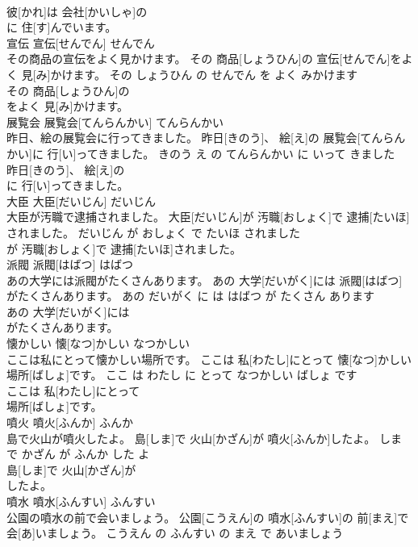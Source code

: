 \documentclass[8pt]{extreport}
\begin{document}
\begin{CJK}{UTF8}{min}
\\	彼[かれ]は 会社[かいしゃ]の
\\	に 住[す]んでいます。			
\\	宣伝	宣伝[せんでん]	せんでん	
\\	その商品の宣伝をよく見かけます。	その 商品[しょうひん]の 宣伝[せんでん]をよく 見[み]かけます。	その しょうひん の せんでん を よく みかけます	
\\	その 商品[しょうひん]の
\\	をよく 見[み]かけます。			
\\	展覧会	展覧会[てんらんかい]	てんらんかい	
\\	昨日、絵の展覧会に行ってきました。	昨日[きのう]、 絵[え]の 展覧会[てんらんかい]に 行[い]ってきました。	きのう え の てんらんかい に いって きました	
\\	昨日[きのう]、 絵[え]の
\\	に 行[い]ってきました。			
\\	大臣	大臣[だいじん]	だいじん	
\\	大臣が汚職で逮捕されました。	大臣[だいじん]が 汚職[おしょく]で 逮捕[たいほ]されました。	だいじん が おしょく で たいほ されました	
\\	が 汚職[おしょく]で 逮捕[たいほ]されました。			
\\	派閥	派閥[はばつ]	はばつ	
\\	あの大学には派閥がたくさんあります。	あの 大学[だいがく]には 派閥[はばつ]がたくさんあります。	あの だいがく に は はばつ が たくさん あります	
\\	あの 大学[だいがく]には
\\	がたくさんあります。			
\\	懐かしい	懐[なつ]かしい	なつかしい	
\\	ここは私にとって懐かしい場所です。	ここは 私[わたし]にとって 懐[なつ]かしい 場所[ばしょ]です。	ここ は わたし に とって なつかしい ばしょ です	
\\	ここは 私[わたし]にとって
\\	場所[ばしょ]です。			
\\	噴火	噴火[ふんか]	ふんか	
\\	島で火山が噴火したよ。	島[しま]で 火山[かざん]が 噴火[ふんか]したよ。	しま で かざん が ふんか した よ	
\\	島[しま]で 火山[かざん]が
\\	したよ。			
\\	噴水	噴水[ふんすい]	ふんすい	
\\	公園の噴水の前で会いましょう。	公園[こうえん]の 噴水[ふんすい]の 前[まえ]で 会[あ]いましょう。	こうえん の ふんすい の まえ で あいましょう	

\end{CJK}
\end{document}
